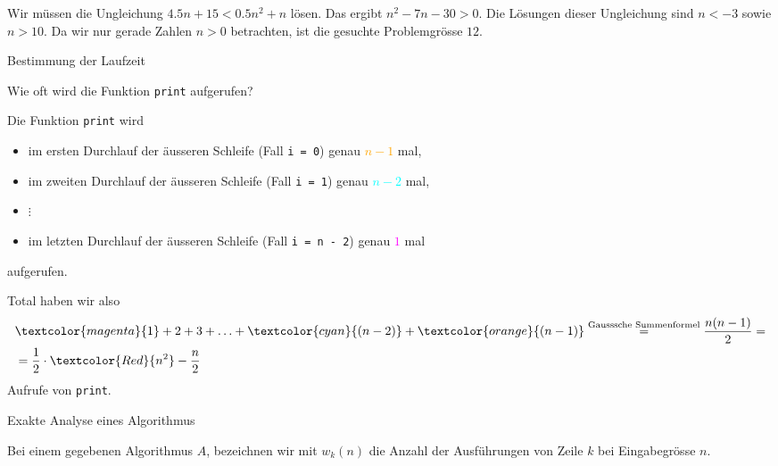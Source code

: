 \begin{frame}
\begin{myanswer}
Wir müssen die Ungleichung \(4.5n + 15 < 0.5n^2 + n\) lösen. Das ergibt \(n^2 - 7n - 30 > 0\). Die Lösungen dieser Ungleichung sind \(n < -3\) sowie \(n > 10\). Da wir nur gerade Zahlen \(n > 0\) betrachten, ist die gesuchte Problemgrösse \(12\).
\end{myanswer}
\end{frame}

\begin{frame}{Bestimmung der Laufzeit \faStar\faStar\faStar[regular]\faStar[regular]\faStar[regular]}
	\begin{myexercise}
    
 
    Wie oft wird die Funktion \lstinline{print} aufgerufen?
	\end{myexercise}
\end{frame}

\begin{frame}[fragile]
\begin{myanswer}
{\scriptsize
    Die Funktion \lstinline{print} wird
    \begin{itemize}
        \item im ersten Durchlauf der äusseren Schleife (Fall \lstinline{i = 0}) genau \textcolor{orange}{$n-1$} mal,
        \item im zweiten Durchlauf der äusseren Schleife (Fall \lstinline{i = 1}) genau \textcolor{cyan}{$n-2$} mal,
        \item $\vdots$
        \item im letzten Durchlauf der äusseren Schleife (Fall \lstinline{i = n - 2}) genau \textcolor{magenta}{$1$} mal
    \end{itemize}
    aufgerufen.

    Total haben wir also
    \begin{align*}
		&\textcolor{magenta}{1} + 2 + 3 + \ldots + \textcolor{cyan}{(n-2)} + \textcolor{orange}{(n-1)} \stackrel{\text{Gausssche Summenformel}}{=} \frac{n(n-1)}{2} =\\
		&= \frac{1}{2}\cdot\textcolor{Red}{n^2} - \frac{n}{2}
	\end{align*}
    Aufrufe von \lstinline{print}.
}%
\end{myanswer}
\end{frame}

\begin{frame}{Exakte Analyse eines Algorithmus}
	\begin{mydefinition}\label{mydefinition:wk}
	Bei einem gegebenen Algorithmus $A$, bezeichnen wir mit $w_k(n)$ die Anzahl der Ausführungen von Zeile $k$ bei Eingabegrösse $n$.
	\end{mydefinition}
\end{frame}

